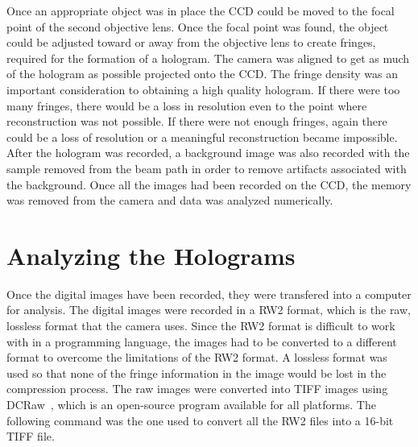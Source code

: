 Once an appropriate object
was in place the CCD could be moved to the focal point of the second objective
lens.
%
Once the focal point was found,
the object could be adjusted toward or away from the objective lens to create fringes,
required for the formation of a hologram.
The camera was aligned to get as much of the
hologram as possible projected onto the CCD\@. The fringe density was an
important consideration to obtaining a high quality hologram.
If there were too many fringes,
there would be a loss in resolution even to the point
where reconstruction was not possible. 
If there were not enough fringes, again there could be a loss of
resolution or a meaningful reconstruction became impossible. 
After the hologram was recorded, a
background image was also recorded with the sample removed from the beam path
in order to remove artifacts associated with the background.
Once all the images had been recorded on the
CCD, the memory was removed from the camera and data was analyzed numerically.

\section{Analyzing the Holograms}

Once the digital images have been recorded, they were transfered into a computer for
analysis. The digital images were recorded in a RW2 format, which is the raw,
lossless format that the camera uses. 
Since the RW2 format is difficult to work with in a programming language,
the images had to be converted to a different format to overcome the
limitations of the RW2 format.
A lossless format was used so that none of the fringe information in the image
would be lost in the compression process. 
The raw images were converted into TIFF images using DCRaw~\cite{DCRaw},
which is an
open-source program available for all platforms. The following command was the
one used to convert all the RW2 files into a 16-bit TIFF file.

